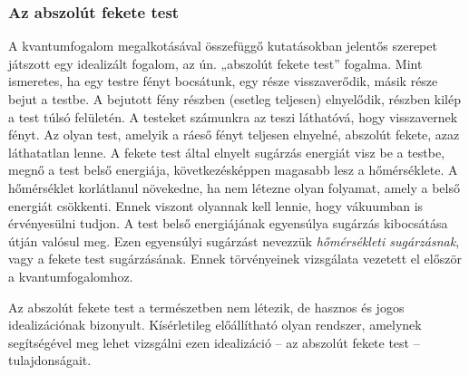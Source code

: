 \documentclass[a4paper,12pt]{article}
\begin{document}
\subsubsection{Az abszolút fekete test}
A kvantumfogalom megalkotásával összefüggő kutatásokban jelentős szerepet játszott egy idealizált fogalom, az ún. „abszolút fekete test” fogalma. Mint ismeretes, ha egy testre fényt bocsátunk, egy része visszaverődik, másik része bejut a testbe. A bejutott fény részben (esetleg teljesen) elnyelődik, részben kilép a test túlsó felületén.
A testeket számunkra az teszi láthatóvá, hogy visszavernek fényt. Az olyan test, amelyik a ráeső fényt teljesen elnyelné, abszolút fekete, azaz láthatatlan lenne. A fekete test által elnyelt sugárzás energiát visz be a testbe, megnő a test belső energiája, következésképpen magasabb lesz a hőmérséklete. A hőmérséklet korlátlanul növekedne,
ha nem létezne olyan folyamat, amely a belső energiát csökkenti. Ennek viszont olyannak kell lennie, hogy vákuumban is érvényesülni tudjon. A test belső energiájának egyensúlya sugárzás kibocsátása útján valósul meg. Ezen egyensúlyi sugárzást nevezzük \textit{hőmérsékleti sugárzásnak}, vagy a fekete test sugárzásának. Ennek törvényeinek vizsgálata vezetett el először a kvantumfogalomhoz.

Az abszolút fekete test a természetben nem létezik, de hasznos és jogos idealizációnak bizonyult. Kísérletileg előállítható olyan rendszer, amelynek segítségével meg lehet vizsgálni ezen idealizáció – az abszolút fekete test – tulajdonságait.
\end{document}
